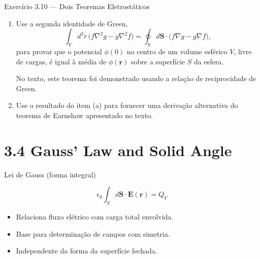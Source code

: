 \documentclass[aspectratio=169,11pt]{beamer}
\begin{document}
\begin{frame}{Exercício 3.10 — Dois Teoremas Eletrostáticos}

\begin{block}{}
\begin{enumerate}
\item[(a)] Use a segunda identidade de Green,
\begin{equation}
\int_V d^3r \,\big(f\nabla^2 g - g\nabla^2 f\big)
=
\oint_S d\mathbf{S}\cdot\big(f\nabla g - g\nabla f\big),
\end{equation}
para provar que o potencial $\phi(0)$ no centro de um volume esférico $V$, livre de cargas, é igual à média de $\phi(\mathbf r)$ sobre a superfície $S$ da esfera. 

\medskip

No texto, este teorema foi demonstrado usando a relação de reciprocidade de Green.

\medskip

\item[(b)] Use o resultado do item (a) para fornecer uma derivação alternativa do teorema de Earnshaw apresentado no texto.
\end{enumerate}
\end{block}

\end{frame}


\section{3.4 Gauss’ Law and Solid Angle}

\begin{frame}{Lei de Gauss (forma integral)}
\begin{eqbox}
\begin{equation}
\epsilon_0 \int_S d\mathbf S \cdot \mathbf E(\mathbf r) = Q_V
\tag{3.39}
\end{equation}
\end{eqbox}

\begin{itemize}
\item Relaciona fluxo elétrico com carga total envolvida.
\item Base para determinação de campos com simetria.
\item Independente da forma da superfície fechada.
\end{itemize}
\end{frame}

\end{document}
